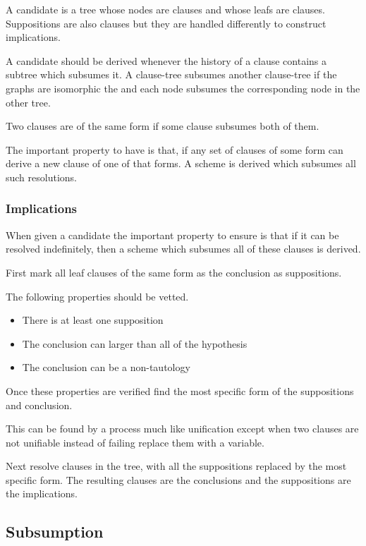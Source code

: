 \documentclass{article}
\begin{document}
A candidate is a tree whose nodes are clauses and whose leafs are clauses.
Suppositions are also clauses but they are handled differently to construct implications.
  
A candidate should be derived whenever the history of a clause contains a subtree which subsumes it.
A clause-tree subsumes another clause-tree
  if the graphs are isomorphic the and each node subsumes the corresponding node in the other tree.

Two clauses are of the same form if some clause subsumes both of them.

The important property to have is that,
if any set of clauses of some form can derive a new clause of one of that forms.
A scheme is derived which subsumes all such resolutions.

\subsubsection{Implications}

When given a candidate the important property to ensure is that if it can be resolved indefinitely,
then a scheme which subsumes all of these clauses is derived.

First mark all leaf clauses of the same form as the conclusion as suppositions.

The following properties should be vetted.
\begin{itemize}
  \item There is at least one supposition
  \item The conclusion can larger than all of the hypothesis
  \item The conclusion can be a non-tautology
\end{itemize}

Once these properties are verified find the most specific form of the suppositions and conclusion.

This can be found by a process much like unification except when two clauses are not unifiable instead 
  of failing replace them with a variable.

Next resolve clauses in the tree, with all the suppositions replaced by the most specific form.
The resulting clauses are the conclusions and the suppositions are the implications.


\subsection{Subsumption}
\end{document}
